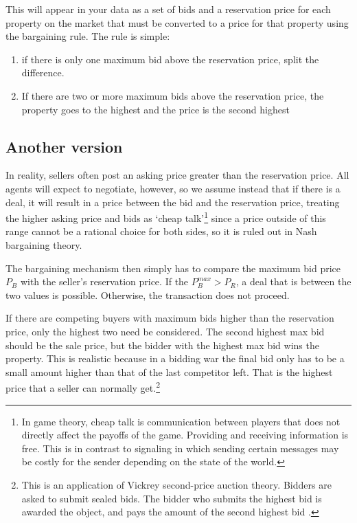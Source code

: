 This will appear in your data as a set of bids and a reservation price for each property on the market that must be converted to a price for that property using the bargaining rule. The rule is simple: 
\begin{enumerate}
    \item if there is only one maximum bid above the reservation price, split the difference.

    \item If there are two or more maximum bids above the reservation price, the property goes to the highest  and the price is the second highest
\end{enumerate}


\subsection{Another version}
In reality, sellers often post an asking price greater than the reservation price. All agents will expect to negotiate, however, so we assume instead that if there is a deal, it will result in a price between the bid and the reservation price, treating the higher asking price and bids as `cheap talk'\footnote{In game theory, cheap talk is communication between players that does not directly affect the payoffs of the game. Providing and receiving information is free. This is in contrast to signaling in which sending certain messages may be costly for the sender depending on the state of the world.} since a price outside of this range cannot be a rational choice for both sides, so it is ruled out in Nash bargaining theory.

The bargaining  mechanism then simply has to compare the maximum bid price $P_B$ with the seller's reservation price. If the $P_B^{max}>P_R$, a deal that is between the two values is possible. Otherwise, the transaction does not proceed.

If there are competing buyers with maximum bids higher than the reservation price, only the highest two need be considered. The second highest max bid should be the sale price, but the bidder with the highest max bid wins the property. This is realistic because in a bidding war the final bid only has to be a small amount higher than that of the last competitor left. That is the highest price that a seller can normally get.\footnote{This is an application of Vickrey \gls{second-price auction} theory. Bidders are asked to submit sealed bids. %
The bidder who submits the highest bid is awarded the object, and pays the amount of the second highest bid \cite{levinAuctionTheory2004}.}

